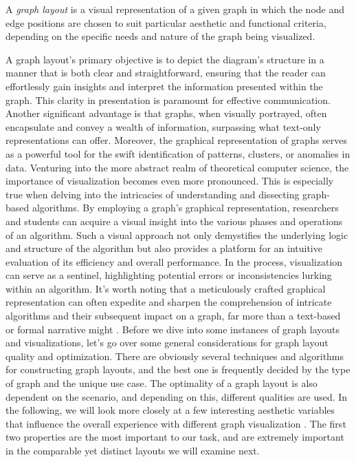 \documentclass[bachelor, english]{algothesis}
\begin{document}
\begin{definition}
    A \emph{graph layout} is a visual representation of a given graph in which the node and edge positions are chosen to suit particular aesthetic and functional criteria, depending on the specific needs and nature of the graph being visualized.
\end{definition}
\noindent
A graph layout's primary objective is to depict the diagram's structure in a manner that is both clear and straightforward, ensuring that the reader can effortlessly gain insights and interpret the information presented within the graph. This clarity in presentation is paramount for effective communication. Another significant advantage is that graphs, when visually portrayed, often encapsulate and convey a wealth of information, surpassing what text-only representations can offer. Moreover, the graphical representation of graphs serves as a powerful tool for the swift identification of patterns, clusters, or anomalies in data. \newline
Venturing into the more abstract realm of theoretical computer science, the importance of visualization becomes even more pronounced. This is especially true when delving into the intricacies of understanding and dissecting graph-based algorithms. By employing a graph's graphical representation, researchers and students can acquire a visual insight into the various phases and operations of an algorithm. Such a visual approach not only demystifies the underlying logic and structure of the algorithm but also provides a platform for an intuitive evaluation of its efficiency and overall performance. In the process, visualization can serve as a sentinel, highlighting potential errors or inconsistencies lurking within an algorithm. It's worth noting that a meticulously crafted graphical representation can often expedite and sharpen the comprehension of intricate algorithms and their subsequent impact on a graph, far more than a text-based or formal narrative might \cite{Visualization}. \newline
Before we dive into some instances of graph layouts and visualizations, let's go over some general considerations for graph layout quality and optimization. There are obviously several techniques and algorithms for constructing graph layouts, and the best one is frequently decided by the type of graph and the unique use case. The optimality of a graph layout is also dependent on the scenario, and depending on this, different qualities are used. In the following, we will look more closely at a few interesting aesthetic variables that influence the overall experience with different graph visualization \cite{aesthetic}. The first two properties are the most important to our task, and are extremely important in the comparable yet distinct layouts we will examine next.
\end{document}
